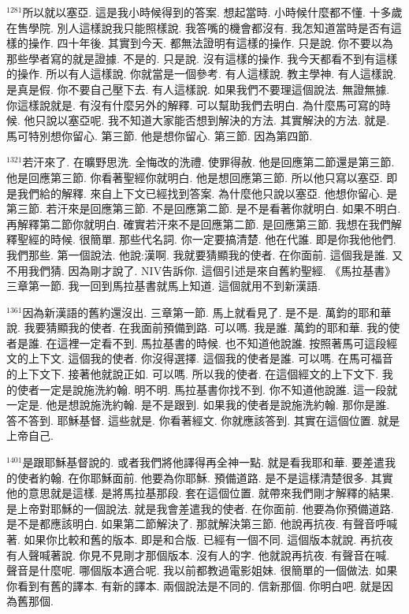 \documentclass{book}
\begin{document}
$^{1281}$所以就以塞亞.
這是我小時候得到的答案.
想起當時.
小時候什麼都不懂.
十多歲在售學院.
別人這樣說我只能照樣說.
我答嘴的機會都沒有.
我怎知道當時是否有這樣的操作.
四十年後.
其實到今天.
都無法證明有這樣的操作.
只是說.
你不要以為那些學者寫的就是證據.
不是的.
只是說.
沒有這樣的操作.
我今天都看不到有這樣的操作.
所以有人這樣說.
你就當是一個參考.
有人這樣說.
教主學神.
有人這樣說.
是真是假.
你不要自己壓下去.
有人這樣說.
如果我們不要理這個說法.
無證無據.
你這樣說就是.
有沒有什麼另外的解釋.
可以幫助我們去明白.
為什麼馬可寫的時候.
他只說以塞亞呢.
我不知道大家能否想到解決的方法.
其實解決的方法.
就是.
馬可特別想你留心.
第三節.
他是想你留心.
第三節.
因為第四節.

$^{1321}$若汗來了.
在曠野思洗.
全悔改的洗禮.
使罪得赦.
他是回應第二節還是第三節.
他是回應第三節.
你看著聖經你就明白.
他是想回應第三節.
所以他只寫以塞亞.
即是我們給的解釋.
來自上下文已經找到答案.
為什麼他只說以塞亞.
他想你留心.
是第三節.
若汗來是回應第三節.
不是回應第二節.
是不是看著你就明白.
如果不明白.
再解釋第二節你就明白.
確實若汗來不是回應第二節.
是回應第三節.
我想在我們解釋聖經的時候.
很簡單.
那些代名詞.
你一定要搞清楚.
他在代誰.
即是你我他他們.
我們那些.
第一個說法.
他說:漢啊.
我就要猜顯我的使者.
在你面前.
這個我是誰.
又不用我們猜.
因為剛才說了.
NIV告訴你.
這個引述是來自舊約聖經.
《馬拉基書》三章第一節.
我一回到馬拉基書就馬上知道.
這個就用不到新漢語.

$^{1361}$因為新漢語的舊約還沒出.
三章第一節.
馬上就看見了.
是不是.
萬鈞的耶和華說.
我要猜顯我的使者.
在我面前預備到路.
可以嗎.
我是誰.
萬鈞的耶和華.
我的使者是誰.
在這裡一定看不到.
馬拉基書的時候.
也不知道他說誰.
按照著馬可這段經文的上下文.
這個我的使者.
你沒得選擇.
這個我的使者是誰.
可以嗎.
在馬可福音的上下文下.
接著他就說正如.
可以嗎.
所以我的使者.
在這個經文的上下文下.
我的使者一定是說施洗約翰.
明不明.
馬拉基書你找不到.
你不知道他說誰.
這一段就一定是.
他是想說施洗約翰.
是不是跟到.
如果我的使者是說施洗約翰.
那你是誰.
答不答到.
耶穌基督.
這些就是.
你看著經文.
你就應該答到.
其實在這個位置.
就是上帝自己.

$^{1401}$是跟耶穌基督說的.
或者我們將他譯得再全神一點.
就是看我耶和華.
要差遣我的使者約翰.
在你耶穌面前.
他要為你耶穌.
預備道路.
是不是這樣清楚很多.
其實他的意思就是這樣.
是將馬拉基那段.
套在這個位置.
就帶來我們剛才解釋的結果.
是上帝對耶穌的一個說法.
就是我會差遣我的使者.
在你面前.
他要為你預備道路.
是不是都應該明白.
如果第二節解決了.
那就解決第三節.
他說再抗夜.
有聲音呼喊著.
如果你比較和舊的版本.
即是和合版.
已經有一個不同.
這個版本就說.
再抗夜有人聲喊著說.
你見不見剛才那個版本.
沒有人的字.
他就說再抗夜.
有聲音在喊.
聲音是什麼呢.
哪個版本適合呢.
我以前都教過電影姐妹.
很簡單的一個做法.
如果你看到有舊的譯本.
有新的譯本.
兩個說法是不同的.
信新那個.
你明白吧.
就是因為舊那個.
\end{document}
